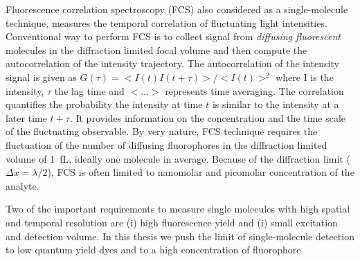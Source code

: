 Fluorescence correlation spectroscopy (FCS) also considered as a single-molecule technique, measures the temporal correlation of fluctuating light intensities.\cite{magde1972thermodynamic,elson1974fluorescence,krichevsky2002fluorescence}
Conventional way to perform FCS is to collect signal from \textit{diffusing fluorescent} molecules in the diffraction limited focal volume and then compute the autocorrelation of the intensity trajectory.
The autocorrelation of the intensity signal is given as $G(\tau)=<I(t)I(t+\tau)>/<I(t)>^2$ where I is the intensity, $\tau$ the lag time and $<...>$ represents time averaging.
The correlation quantifies the probability the intensity at time $t$ is similar to the intensity at a later time $t+\tau$.
It provides information on the concentration and the time scale of the fluctuating observable.
By very nature, FCS technique requires the fluctuation of the number of diffusing fluorophores in the diffraction limited volume of \SI{1}{fL}, ideally one molecule in average.
Because of the diffraction limit ($\Delta{x}={\lambda}/2$), FCS is often limited to nanomolar and picomolar concentration of the analyte. 

Two of the important requirements to measure single molecules with high spatial and temporal resolution are (i) high fluorescence yield and (i) small excitation and detection volume.
In this thesis we push the limit of single-molecule detection to low quantum yield dyes and to a high concentration of fluorophore.

